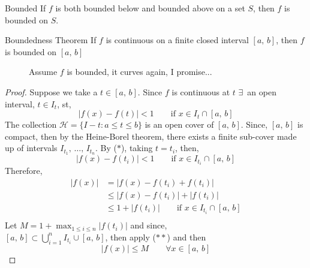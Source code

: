 \documentclass{article}
\newcommand{\sub}{\subset}
\renewcommand{\d}{\delta}
\newcommand{\e}{\varepsilon}
\newcommand{\ex}{\exists\,}
\begin{document}
\noindent\begin{definition}{Bounded}{}
  If $f$ is both bounded below and bounded above on a set $S$, then $f$ is bounded on $S$.
\end{definition}\vspace{10pt}
\begin{theorem}{Boundedness Theorem}{}
  If $f$ is continuous on a finite closed interval $[a,\, b]$, then $f$ is bounded on $[a,\,b]$
\end{theorem}
\begin{figure}[H]
  \centering
  \caption{Assume $f$ is bounded, it curves again, I promise...}
\end{figure}
\begin{proof}
  Suppose we take a $t\in[a,\,b]$. Since $f$ is continuous at $t $  $\ex $ an open interval, $t\in I_t$, st,
  \begin{equation*}
  |f(x) - f(t)|<1 \qquad\text{if $x\in I_t\cap[a,\,b]$}\tag{$*$}
\end{equation*}
  The collection $\displaystyle{\mathcal{H} = \{ I-t : a \le t \le b \}}$ is an open cover of $[a,\, b]$. Since, $[a,\, b]$ is compact, then by the Heine-Borel theorem, there exists a finite sub-cover made up of intervals $I_{t_1},\,\dots,\,I_{t_n}$. By ($*$), taking $t = t_i$, then,
  $$ |f(x) - f(t_i)|< 1 \qquad\text{if $x\in I_{t_i}\cap[a,\,b]$} $$
  Therefore,
  \begin{align*}
    |f(x)| &= |f(x) - f(t_i) + f(t_i)| \\
    &\le |f(x) - f(t_i)| + |f(t_i)| \\
    &\le 1 + |f(t_i)|\qquad \text{if $x\in I_{t_i}\cap[a,\,b]$} \tag{$**$}\\
  \end{align*}
Let $\displaystyle{M = 1 + \max_{1\le i\le n}{|f(t_i)|}}$ and since,\\ $\displaystyle{[a,\,b]\sub \bigcup_{i=1}^n{I_{t_i}\cup[a,\,b]}}$, then apply ($**$) and then
$$ |f(x)| \le M \qquad\forall x\in[a,\,b] $$
\end{proof}
\end{document}
